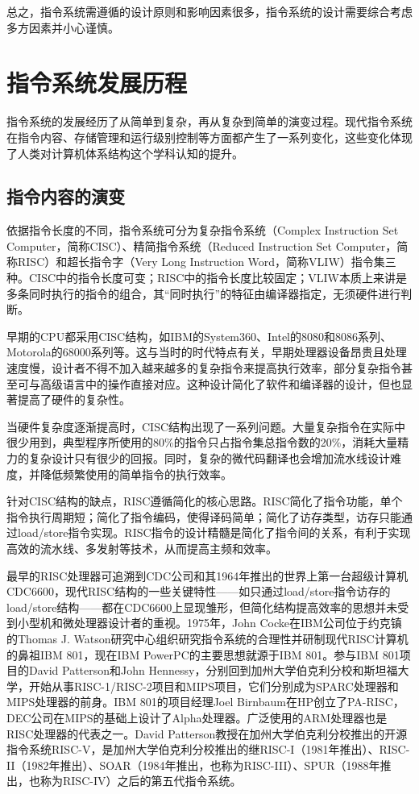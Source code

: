 \documentclass[]{ctexbook}
\begin{document}
总之，指令系统需遵循的设计原则和影响因素很多，指令系统的设计需要综合考虑多方因素并小心谨慎。

\hypertarget{ux6307ux4ee4ux7cfbux7edfux53d1ux5c55ux5386ux7a0b}{%
\section{指令系统发展历程}\label{ux6307ux4ee4ux7cfbux7edfux53d1ux5c55ux5386ux7a0b}}

指令系统的发展经历了从简单到复杂，再从复杂到简单的演变过程。现代指令系统在指令内容、存储管理和运行级别控制等方面都产生了一系列变化，这些变化体现了人类对计算机体系结构这个学科认知的提升。

\hypertarget{ux6307ux4ee4ux5185ux5bb9ux7684ux6f14ux53d8}{%
\subsection{指令内容的演变}\label{ux6307ux4ee4ux5185ux5bb9ux7684ux6f14ux53d8}}

依据指令长度的不同，指令系统可分为复杂指令系统（Complex Instruction Set Computer，简称CISC）、精简指令系统（Reduced Instruction Set Computer，简称RISC）和超长指令字（Very Long Instruction Word，简称VLIW）指令集三种。CISC中的指令长度可变；RISC中的指令长度比较固定；VLIW本质上来讲是多条同时执行的指令的组合，其``同时执行''的特征由编译器指定，无须硬件进行判断。

早期的CPU都采用CISC结构，如IBM的System360、Intel的8080和8086系列、Motorola的68000系列等。这与当时的时代特点有关，早期处理器设备昂贵且处理速度慢，设计者不得不加入越来越多的复杂指令来提高执行效率，部分复杂指令甚至可与高级语言中的操作直接对应。这种设计简化了软件和编译器的设计，但也显著提高了硬件的复杂性。

当硬件复杂度逐渐提高时，CISC结构出现了一系列问题。大量复杂指令在实际中很少用到，典型程序所使用的80\%的指令只占指令集总指令数的20\%，消耗大量精力的复杂设计只有很少的回报。同时，复杂的微代码翻译也会增加流水线设计难度，并降低频繁使用的简单指令的执行效率。

针对CISC结构的缺点，RISC遵循简化的核心思路。RISC简化了指令功能，单个指令执行周期短；简化了指令编码，使得译码简单；简化了访存类型，访存只能通过load/store指令实现。RISC指令的设计精髓是简化了指令间的关系，有利于实现高效的流水线、多发射等技术，从而提高主频和效率。

最早的RISC处理器可追溯到CDC公司和其1964年推出的世界上第一台超级计算机CDC6600，现代RISC结构的一些关键特性------如只通过load/store指令访存的load/store结构------都在CDC6600上显现雏形，但简化结构提高效率的思想并未受到小型机和微处理器设计者的重视。1975年，John Cocke在IBM公司位于约克镇的Thomas J. Watson研究中心组织研究指令系统的合理性并研制现代RISC计算机的鼻祖IBM 801，现在IBM PowerPC的主要思想就源于IBM 801。参与IBM 801项目的David Patterson和John Hennessy，分别回到加州大学伯克利分校和斯坦福大学，开始从事RISC-1/RISC-2项目和MIPS项目，它们分别成为SPARC处理器和MIPS处理器的前身。IBM 801的项目经理Joel Birnbaum在HP创立了PA-RISC，DEC公司在MIPS的基础上设计了Alpha处理器。广泛使用的ARM处理器也是RISC处理器的代表之一。David Patterson教授在加州大学伯克利分校推出的开源指令系统RISC-V，是加州大学伯克利分校推出的继RISC-I（1981年推出）、RISC-II（1982年推出）、SOAR（1984年推出，也称为RISC-III）、SPUR（1988年推出，也称为RISC-IV）之后的第五代指令系统。
\end{document}
